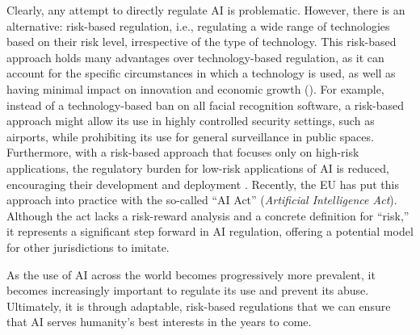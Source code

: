 Clearly, any attempt to directly regulate AI is problematic. However, there is an alternative: risk-based regulation, i.e., regulating a wide range of technologies based on their risk level, irrespective of the type of technology. This risk-based approach holds many advantages over technology-based regulation, as it can account for the specific circumstances in which a technology is used, as well as having minimal impact on innovation and economic growth (\cites{MarcinekEtAl2024RANDAIActPrimer}{Bradford2023RaceToRegulateAI}). For example, instead of a technology-based ban on all facial recognition software, a risk-based approach might allow its use in highly controlled security settings, such as airports, while prohibiting its use for general surveillance in public spaces. Furthermore, with a risk-based approach that focuses only on high-risk applications, the regulatory burden for low-risk applications of AI is reduced, encouraging their development and deployment \autocite[p..\ 4--6]{Ebers2024RiskBasedEUAIACT}. Recently, the EU has put this approach into practice with the so-called “AI Act” (\emph{Artificial Intelligence Act}). Although the act lacks a risk-reward analysis and a concrete definition for “risk,” it represents a significant step forward in AI regulation, offering a potential model for other jurisdictions to imitate.

As the use of AI across the world becomes progressively more prevalent, it becomes increasingly important to regulate its use and prevent its abuse. Ultimately, it is through adaptable, risk-based regulations that we can ensure that AI serves humanity's best interests in the years to come.
